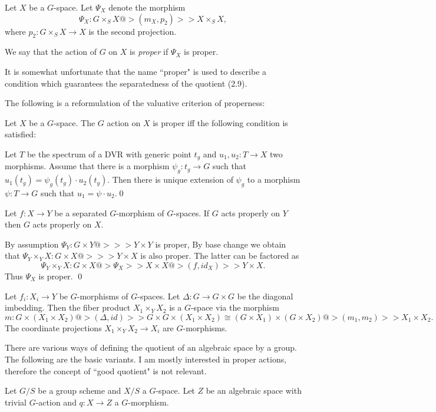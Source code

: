  Let $X$ be a $G$-space.  Let $\Psi_X$
denote the morphism
$$
\Psi_X:G\times_S X@>{(m_X,p_2)}>> X\times_S X,
$$
where $p_2:G\times_S X\to X$ is the second projection.

 We say that the  action of
$G$ on $X$ is  {\it proper} if  $\Psi_X$ is proper.
\enddemo


It is somewhat unfortunate that the name ``proper" is
  used  to describe a condition which guarantees the
separatedness of the quotient (2.9).
\enddemo

The following is a reformulation of the valuative criterion of properness:

   Let $X$ be a $G$-space.  The $G$ action on $X$ is
proper iff the following condition  is satisfied:

Let
$T$ be the spectrum of a DVR with generic point
$t_g$ and
$u_1,u_2:T\to X$ two morphisms. Assume that  there is a morphism $\psi_g:t_g\to
G$ such that $u_1(t_g)=\psi_g(t_g)\cdot  u_2(t_g)$.  Then
there is unique extension of  $\psi_g$ to a  morphism $\psi:T\to
G$ such that $u_1=\psi\cdot  u_2$.\qed
\endproclaim


  Let $f:X\to Y$ be a  separated $G$-morphism of
$G$-spaces.
 If  $G$ acts properly on $Y$ then $G$ acts properly on $X$.
\endproclaim

\demop  By assumption $\Psi_Y: G\times Y@>>> Y\times Y$ is proper, By base
change we obtain that  $\Psi_Y\times_YX: G\times X@>>> Y\times X$ is also
proper. The latter can be factored as
$$
\Psi_Y\times_YX: G\times X@>\Psi_X>> X\times X@>{(f,id_X)}>> Y\times X.
$$
Thus $\Psi_X$ is proper.
\qed\enddemo

Let $f_i:X_i\to Y$  be $G$-morphisms of $G$-spaces.
Let $\Delta:G\to G\times G$ be the diagonal imbedding. Then
the fiber product $X_1\times_YX_2$ is a
$G$-space via the morphism
$$
m:G\times(X_1\times X_2)@>{(\Delta,id)}>>G\times G\times(X_1\times X_2)
\cong (G\times X_1)\times(G\times X_2)@>{(m_1,m_2)}>> X_1\times X_2.
$$
The coordinate projections $X_1\times_YX_2\to X_i$
are $G$-morphisms.
\enddemo

There are various ways of defining the quotient of an algebraic space by a
group.  The following are the basic variants. I am mostly interested in
proper actions, therefore the concept of ``good quotient" is not relevant.

 Let $G/S$ be a group scheme and $X/S$ a $G$-space.
Let $Z$ be an algebraic  space with trivial $G$-action and $q:X\to Z$ a
$G$-morphism.

